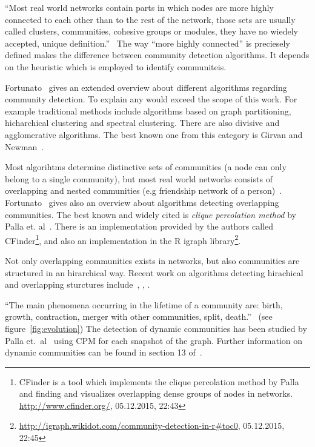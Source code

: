 \documentclass[runningheads,a4paper]{llncs}
\begin{document}
``Most real world networks contain parts in which nodes are more highly connected to each other than to the rest of the network, those sets are usually called clusters, communities, cohesive groups or modules, they have no wiedely accepted, unique definition.''~\cite{palla2005uncovering}
The way ``more highly connected'' is preciesely defined makes the difference between community detection algorithms.
It depends on the heuristic which is employed to identify communiteis.~\cite{porter2009communities}

Fortunato~\cite{fortunato2010community} gives an extended overview about different algorithms regarding community detection.
To explain any would exceed the scope of this work.
For example traditional methods include algorithms based on graph partitioning, hicharchical clustering and spectral clustering.
There are also divisive and agglomerative algorithms.
The best known one from this category is Girvan and Newman~\cite{girvan2002community}.

Most algorihtms determine distinctive sets of communities (a node can only belong to a single community), but most real world networks  consists of overlapping and nested communities (e.g friendship network of a person)~\cite{palla2005uncovering}.
Fortunato~\cite{fortunato2010community} gives also an overview about algorithms detecting overlapping communities.
The best known and widely cited is \emph{clique percolation method} by Palla et. al~\cite{palla2005uncovering}.
There is an implementation provided by the authors called CFinder\footnote{CFinder is a tool which implements the clique percolation method by Palla and finding and visualizes overlapping dense groups of nodes in networks. \url{http://www.cfinder.org/}, 05.12.2015, 22:43}, and also an implementation in the R igraph library\footnote{\url{http://igraph.wikidot.com/community-detection-in-r#toc0}, 05.12.2015, 22:45}.

Not only overlapping communities exists in networks, but also communities are structured in an hirarchical way.
Recent work on algorithms detecting hirachical and overlapping sturctures  include~\cite{1367-2630-11-3-033015}, \cite{Cui201485}, \cite{Shen20091706}.

``The main phenomena occurring in the lifetime of a community are: birth, growth, contraction, merger with other communities, split, death.''~\cite{fortunato2010community} (see figure~\ref{fig:evolution})
The detection of dynamic communities has been studied by Palla et.~al~\cite{palla2007quantifying} using CPM for each snapshot of the graph. Further information on dynamic communities can be found in section 13 of~\cite{fortunato2010community}.
\end{document}
